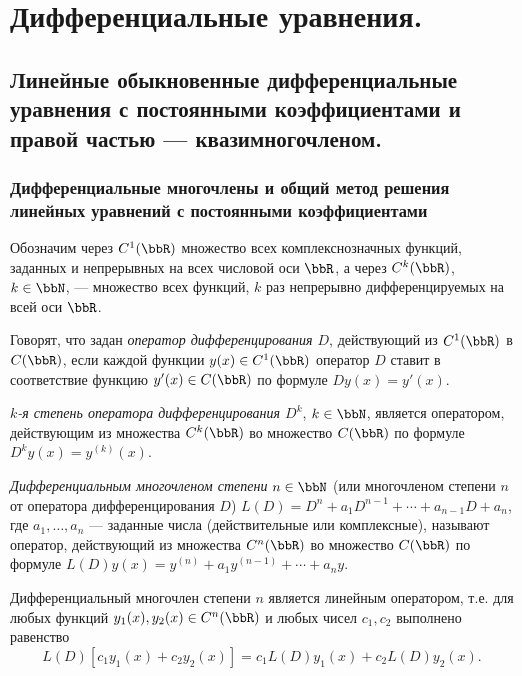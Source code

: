 \part[Дифференциальные уравнения.]{Дифференциальные уравнения.}%

\chapter{Линейные обыкновенные дифференциальные уравнения с постоянными коэффициентами и правой частью — квазимногочленом.}
\section{Дифференциальные многочлены и общий метод решения линейных уравнений с постоянными коэффициентами}
Обозначим через $C^1(\bbR)$ множество всех комплекснозначных функций, заданных и непрерывных на всех числовой оси $\bbR$, а через $C^k(\bbR)$, $k\in \bbN$, --- множество всех функций, $k$ раз непрерывно дифференцируемых на всей оси $\bbR$.
\begin{defn} \label{ch26.1defn1}
Говорят, что задан \textit{оператор дифференцирования $D$}, действующий из $C^1(\bbR)$ в $C(\bbR)$, если каждой функции $y(x)\in C^1(\bbR)$ оператор $D$ ставит в соответствие функцию $y'(x) \in C(\bbR)$ по формуле $Dy(x)=y'(x)$.
\end{defn}

\begin{defn} \label{ch26.1defn2}
\textit{$k$-я степень оператора дифференцирования $D^k$}, $k\in \bbN$, является оператором, действующим из множества $C^k(\bbR)$ во множество $C(\bbR)$ по формуле $D^ky(x)=y^{(k)}(x)$.
\end{defn}

\begin{defn} \label{ch26.1defn3}
\textit{Дифференциальным многочленом степени} $n \in \bbN$ (или многочленом степени $n$ от оператора дифференцирования $D$) $L(D) = D^n + a_1D^{n-1}+\cdots+a_{n-1}D + a_n$, где $a_1, \dots , a_n$ --- заданные числа (действительные или комплексные), называют оператор, действующий из множества $C^n(\bbR)$ во множество $C(\bbR)$ по формуле $L(D)y(x)=y^{(n)}+a_1y^{(n-1)}+\cdots+a_ny.$
\end{defn}

\begin{lemm} \label{ch26lemm1.1}
Дифференциальный многочлен степени $n$ является линейным оператором, т.е. для любых функций $y_1(x),y_2(x)\in C^n(\bbR)$ и любых чисел $c_1,c_2$ выполнено равенство
$$
L(D)[c_1y_1(x)+c_2y_2(x)]=c_1L(D)y_1(x)+c_2L(D)y_2(x).
$$ 
\end{lemm}

